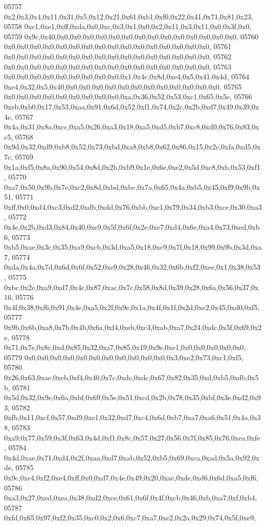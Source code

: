 \begin{DoxyCode}
05757   0x2,0x3,0x4,0x11,0x31,0x5,0x12,0x21,0x61,0xb1,0xf0,0x22,0x41,0x71,0x81,0x23,
05758   0xc1,0xe1,0xff,0xda,0x0,0xc,0x3,0x1,0x0,0x2,0x11,0x3,0x11,0x0,0x3f,0x0,
05759   0x9c,0x40,0x0,0x0,0x0,0x0,0x0,0x0,0x0,0x0,0x0,0x0,0x0,0x0,0x0,0x0,
05760   0x0,0x0,0x0,0x0,0x0,0x0,0x0,0x0,0x0,0x0,0x0,0x0,0x0,0x0,0x0,0x0,
05761   0x0,0x0,0x0,0x0,0x0,0x0,0x0,0x0,0x0,0x0,0x0,0x0,0x0,0x0,0x0,0x0,
05762   0x0,0x0,0x0,0x0,0x0,0x0,0x0,0x0,0x0,0x0,0x0,0x0,0x0,0x0,0x0,0x0,
05763   0x0,0x0,0x0,0x0,0x0,0x0,0x0,0x0,0x0,0x1,0x4c,0x8d,0xe4,0x5,0x41,0x4d,
05764   0xe4,0x32,0x5,0x40,0x0,0x0,0x0,0x0,0x0,0x0,0x0,0x0,0x0,0x0,0x0,0x0,
05765   0x0,0x0,0x0,0x0,0x0,0x0,0x0,0x0,0x0,0xa,0x36,0x52,0x53,0xc1,0x65,0x5e,
05766   0xeb,0xb0,0x17,0x53,0xaa,0x91,0x6d,0x52,0xf1,0x74,0x2c,0x2b,0xd7,0x49,0x39,0x4e,
05767   0x4a,0x31,0x8a,0xcc,0xa5,0x26,0xa3,0x18,0xa5,0xd5,0xb7,0xc8,0xd0,0x76,0x83,0xc5,
05768   0x9d,0x32,0xd9,0xb8,0x52,0x73,0xbd,0xa8,0xb8,0x62,0x86,0x15,0x2c,0xfa,0xd5,0x7c,
05769   0x1a,0xf5,0x8a,0x90,0x54,0x8d,0x2b,0xb9,0x1e,0x6e,0xe2,0x5d,0xc8,0xb,0x53,0xf1,
05770   0xa7,0x50,0x9b,0x7e,0xc2,0x8d,0xbd,0xbc,0x7a,0x65,0x4a,0xb5,0x45,0xf9,0x9b,0x51,
05771   0xff,0x0,0xd4,0xc3,0xd2,0xdb,0xdd,0x76,0xbb,0xe1,0x79,0x34,0xb3,0xce,0x30,0xa3,
05772   0x4e,0x2b,0xd3,0x84,0x40,0xe9,0x5f,0x6f,0x2e,0xe7,0xd4,0x6e,0xa4,0x73,0xed,0xb6,
05773   0xb5,0xae,0x3c,0x35,0xa9,0xcb,0x3d,0xa5,0x18,0xc9,0x7f,0x18,0x99,0x9b,0x3d,0xa7,
05774   0xda,0x4a,0x7d,0x6d,0x6f,0x52,0xe9,0x28,0x46,0x32,0x6b,0xf2,0xee,0x1,0x38,0x53,
05775   0xbc,0x2e,0xa9,0xd7,0x4c,0x87,0xac,0x7c,0x58,0x8d,0x39,0x28,0x6a,0x56,0x37,0x16,
05776   0x4f,0x38,0xf6,0x91,0x4e,0xa5,0x2f,0x9e,0x1a,0x4f,0x1f,0x2d,0xe2,0x45,0xd0,0xf5,
05777   0x9b,0x6b,0xa8,0x7b,0x4b,0x6a,0xf4,0xeb,0xc3,0xab,0xa7,0x24,0xdc,0x5f,0x69,0x2e,
05778   0x71,0x7e,0x8c,0xd,0x85,0x32,0xa7,0x85,0x19,0x9e,0xe1,0x0,0x0,0x0,0x0,0x0,
05779   0x0,0x0,0x0,0x0,0x0,0x0,0x0,0x0,0x0,0x0,0x0,0x3,0xe2,0x73,0xc1,0xf5,
05780   0x26,0x63,0xae,0xeb,0xf4,0x40,0x7c,0xdc,0xdc,0x67,0x82,0x35,0xd,0xb5,0xdb,0x5b,
05781   0x5d,0x32,0x9e,0x6a,0xbf,0x69,0x5e,0x51,0xcd,0x2b,0x78,0x35,0xbf,0x3e,0xd2,0x93,
05782   0xfb,0x11,0xcf,0x57,0xd9,0xe1,0x32,0xd7,0xc4,0x6d,0xb7,0xa7,0xa6,0x51,0x4a,0x38,
05783   0xa9,0x77,0x59,0x3f,0x63,0x4d,0xf1,0x8c,0x57,0x27,0x56,0x7f,0x85,0x76,0xea,0xfe,
05784   0x4d,0xae,0x71,0xd4,0x2f,0xaa,0xd7,0xab,0x52,0xb5,0x69,0xca,0xad,0x5a,0x92,0xde,
05785   0x9c,0xe4,0xf2,0xe4,0xff,0x0,0xd7,0x4e,0x49,0x20,0xac,0xde,0xd6,0x6d,0xa5,0xf6,
05786   0xa3,0x27,0xed,0xea,0x38,0xd2,0xce,0x61,0x6f,0x4f,0xcb,0x46,0xb,0xa7,0xf,0xb4,
05787   0xfd,0x65,0x97,0xf2,0x35,0xc0,0x2,0x6,0xc7,0xa7,0xe2,0x2a,0x29,0x74,0x5f,0xe9,

\end{DoxyCode}
